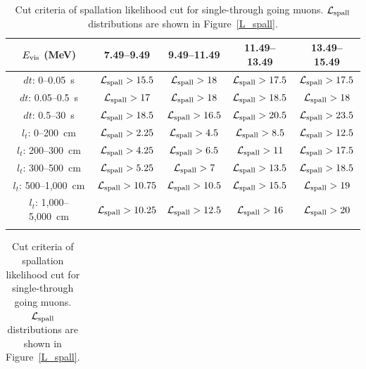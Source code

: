 \begin{table}[p]
	\centering
	\caption[Cut criteria of spallation likelihood cut for single-through going muons]{
	Cut criteria of spallation likelihood cut for single-through going muons.
	$\mathcal{L}_{\rm spall}$ distributions are shown in Figure~\ref{L_spall}.
	}\label{tab:cut_single}
	\vs
	\begin{tabular}{ccccc} \hline \hline
		$E_{\rm vis}$ (MeV)      & 7.49--9.49                        & 9.49--11.49                      & 11.49--13.49                     & 13.49--15.49                     \\ \hline
		$dt$: 0--0.05~s          & $\mathcal{L}_{\rm spall} > 15.5$  & $\mathcal{L}_{\rm spall} > 18$   & $\mathcal{L}_{\rm spall} > 17.5$ & $\mathcal{L}_{\rm spall} > 17.5$ \\
		$dt$: 0.05--0.5~s        & $\mathcal{L}_{\rm spall} > 17$    & $\mathcal{L}_{\rm spall} > 18$   & $\mathcal{L}_{\rm spall} > 18.5$ & $\mathcal{L}_{\rm spall} > 18$   \\
		$dt$: 0.5--30~s          & $\mathcal{L}_{\rm spall} > 18.5$  & $\mathcal{L}_{\rm spall} > 16.5$ & $\mathcal{L}_{\rm spall} > 20.5$ & $\mathcal{L}_{\rm spall} > 23.5$ \\
		$l_{t}$: 0--200~cm       & $\mathcal{L}_{\rm spall} > 2.25$  & $\mathcal{L}_{\rm spall} > 4.5$  & $\mathcal{L}_{\rm spall} > 8.5$  & $\mathcal{L}_{\rm spall} > 12.5$ \\
		$l_{t}$: 200--300~cm     & $\mathcal{L}_{\rm spall} > 4.25$  & $\mathcal{L}_{\rm spall} > 6.5$  & $\mathcal{L}_{\rm spall} > 11$   & $\mathcal{L}_{\rm spall} > 17.5$ \\
		$l_{t}$: 300--500~cm     & $\mathcal{L}_{\rm spall} > 5.25$  & $\mathcal{L}_{\rm spall} > 7$    & $\mathcal{L}_{\rm spall} > 13.5$ & $\mathcal{L}_{\rm spall} > 18.5$ \\
		$l_{t}$: 500--1,000~cm   & $\mathcal{L}_{\rm spall} > 10.75$ & $\mathcal{L}_{\rm spall} > 10.5$ & $\mathcal{L}_{\rm spall} > 15.5$ & $\mathcal{L}_{\rm spall} > 19$   \\
		$l_{t}$: 1,000--5,000~cm & $\mathcal{L}_{\rm spall} > 10.25$ & $\mathcal{L}_{\rm spall} > 12.5$ & $\mathcal{L}_{\rm spall} > 16$   & $\mathcal{L}_{\rm spall} > 20$   \\ \hline \hline
		                         &                                   &                                  &                                  &
	\end{tabular}
	\begin{tabular}{cccc} \hline \hline

\end{tabular}
\end{table}
